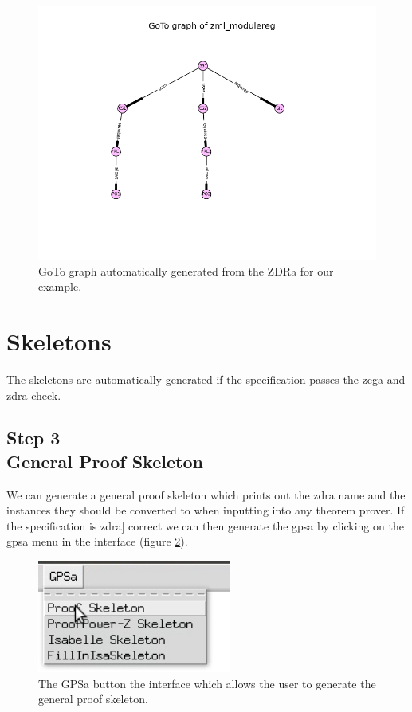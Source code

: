 \begin{figure}[H]
\centering
\includegraphics[scale=0.55]{Figures/fullexample/goto_fullexample.jpg}
\caption{GoTo graph automatically generated from the ZDRa for our example. \label{fig:gotoexample}}
\end{figure}

\section{Skeletons}

The skeletons are automatically generated if the specification passes the \gls{zcga} and \gls{zdra} check.

\subsection{Step 3\\General Proof Skeleton}

We can generate a general proof skeleton which prints out the \gls{zdra} name and the instances they should be converted to when inputting into any theorem prover. If the specification is \gls{zdra}] correct we can then generate the \gls{gpsa} by clicking on the \gls{gpsa} menu in the interface (figure \ref{fig:gpsabutton}).

\begin{figure}[H]
\centering
\includegraphics[scale=0.45]{Figures/fullexample/gpsa.png}
\caption{The GPSa button the interface which allows the user to generate the general proof skeleton. \label{fig:gpsabutton}}
\end{figure}

